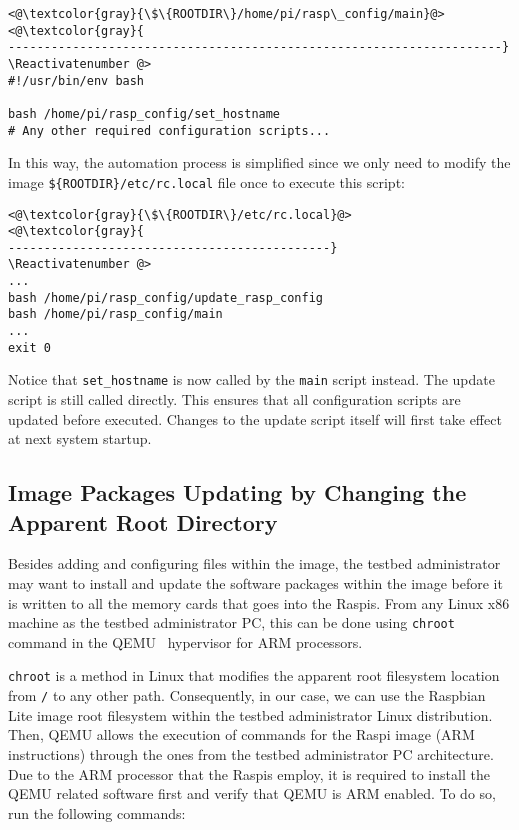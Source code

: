 \Suppressnumber\begin{lstlisting}[]
<@\textcolor{gray}{\$\{ROOTDIR\}/home/pi/rasp\_config/main}@>
<@\textcolor{gray}{
---------------------------------------------------------------------}
\Reactivatenumber @>
#!/usr/bin/env bash

bash /home/pi/rasp_config/set_hostname
# Any other required configuration scripts...
\end{lstlisting}
\FloatBarrier
\vspace{-5mm}

In this way, the automation process is simplified since we only need to modify
the image \texttt{\$\{ROOTDIR\}/etc/rc.local} file once to execute this script:

\Suppressnumber\begin{lstlisting}[]
<@\textcolor{gray}{\$\{ROOTDIR\}/etc/rc.local}@>
<@\textcolor{gray}{
---------------------------------------------}
\Reactivatenumber @>
...
bash /home/pi/rasp_config/update_rasp_config
bash /home/pi/rasp_config/main
...
exit 0
\end{lstlisting}
\FloatBarrier
\vspace{-5mm}

Notice that \texttt{set\_hostname} is now called by the \texttt{main}
script instead. The update script is still called directly. This ensures that
all configuration scripts are updated before executed. Changes to the update
script itself will first take effect at next system startup.

\subsection{Image Packages Updating by Changing the Apparent Root Directory}
Besides adding and configuring files within the image, the testbed
administrator may want to install and update the software packages
within the image before it is written to all the memory cards that goes
into the \ac{Raspi}s. From any Linux x86 machine as the testbed administrator
\ac{PC}, this can be done using \texttt{chroot} command in the
QEMU~\cite{QemuUserEmulation} hypervisor for \ac{ARM} processors.

\texttt{chroot} is a method in Linux that modifies the apparent root
filesystem location from \texttt{/} to any other path. Consequently, in
our case, we can use the Raspbian Lite image root filesystem within the
testbed administrator Linux distribution. Then, QEMU allows the execution
of commands for the \ac{Raspi} image (\ac{ARM} instructions) through the ones
from the testbed administrator \ac{PC} architecture. Due to the \ac{ARM}
processor that the \ac{Raspi}s employ, it is required to install the QEMU related software first and verify that QEMU is \ac{ARM} enabled. To do so,
run the following commands:

